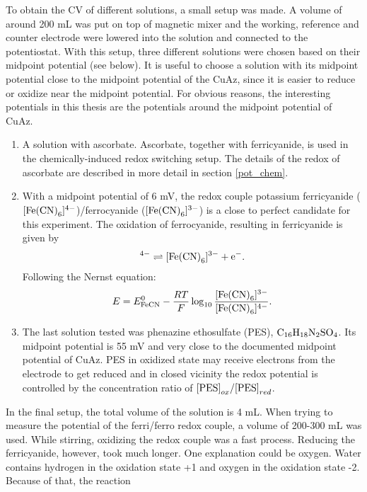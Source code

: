 \documentclass[twoside,single]{lion-msc}
\begin{document}
To obtain the CV of different solutions, a small setup was made. A volume of around 200 mL was put on top of magnetic mixer and the working, reference and counter electrode were lowered into the solution and connected to the potentiostat. With this setup, three different solutions were chosen based on their midpoint potential (see below). It is useful to choose a solution with its midpoint potential close to the midpoint potential of the CuAz, since it is easier to reduce or oxidize near the midpoint potential. For obvious reasons, the interesting potentials in this thesis are the potentials around the midpoint potential of CuAz.
\begin{enumerate}
\item A solution with ascorbate. Ascorbate, together with ferricyanide, is used in the chemically-induced redox switching setup. The details of the redox of ascorbate are described in more detail in section \ref{pot_chem}.
\item With a midpoint potential of 6 mV, the redox couple potassium ferricyanide ($[\textup{Fe(CN)}_{6}]^{4-}$)/ferrocyanide ($[\textup{Fe(CN)}_{6}]^{3-}$) is a close to perfect candidate for this experiment. The oxidation of ferrocyanide, resulting in ferricyanide is given by
\begin{equation}
[\textup{Fe(CN)}_{6}]^{4-}\rightleftharpoons[\textup{Fe(CN)}_{6}]^{3-} + \textup{e}^{-}.
\end{equation}
Following the Nernst equation:
\begin{equation}
E = E^{0}_{\textup{FeCN}} - \frac{RT}{F} \log_{10} \frac{[\textup{Fe(CN)}_{6}]^{3-}}{[\textup{Fe(CN)}_{6}]^{4-}}.
\end{equation}
\item The last solution tested was phenazine ethosulfate (PES), $\textup{C}_{16}\textup{H}_{18}\textup{N}_{2}\textup{SO}_{4}$. Its midpoint potential is 55 mV and very close to the documented midpoint potential of CuAz. PES in oxidized state may receive electrons from the electrode to get reduced and in closed vicinity the redox potential is controlled by the concentration ratio of $\textup{[PES]}_{ox}/\textup{[PES]}_{red}$. 
\end{enumerate}
In the final setup, the total volume of the solution is 4 mL. When trying to measure the potential of the ferri/ferro redox couple, a volume of 200-300 mL was used. While stirring, oxidizing the redox couple was a fast process. Reducing the ferricyanide, however, took much longer. One explanation could be oxygen. Water contains hydrogen in the oxidation state +1 and oxygen in the oxidation state -2. Because of that, the reaction
\end{document}
